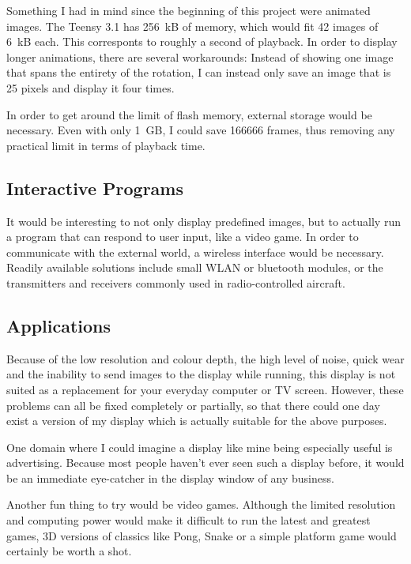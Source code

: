 \documentclass[a4paper, 11pt, titlepage]{report}
\begin{document}
Something I had in mind since the beginning of this project were animated images. The Teensy 3.1
has \SI{256}{kB} of memory, which would fit 42 images of \SI{6}{kB} each. This
corresponts to roughly a second of playback. In order to display longer animations, there are
several workarounds: Instead of showing one image that spans the entirety of the rotation, I can
instead only save an image that is 25 pixels and display it four times.

In order to get around the limit of flash memory, external storage would be necessary. Even with
only \SI{1}{GB}, I could save 166666 frames, thus removing any practical limit in terms of
playback time.

\subsection{Interactive Programs}

It would be interesting to not only display predefined images, but to actually run a program that
can respond to user input, like a video game. In order to communicate with the external world, a
wireless interface would be necessary. Readily available solutions include small WLAN or bluetooth
modules, or the transmitters and receivers commonly used in radio-controlled aircraft.

\subsection{Applications}

Because of the low resolution and colour depth, the high level of noise, quick wear and the
inability to send images to the display while running, this display is not suited as a replacement
for your everyday computer or TV screen. However, these problems can all be fixed completely or
partially, so that there could one day exist a version of my display which is actually suitable
for the above purposes.

One domain where I could imagine a display like mine being especially useful is advertising.
Because most people haven't ever seen such a display before, it would be an immediate eye-catcher
in the display window of any business.

Another fun thing to try would be video games. Although the limited resolution and computing power
would make it difficult to run the latest and greatest games, 3D versions of classics like Pong,
Snake or a simple platform game would certainly be worth a shot.
\end{document}
